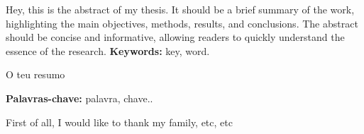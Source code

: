 


Hey, this is the abstract of my thesis. It should be a brief summary of the work, highlighting the main objectives, methods, results, and conclusions. The abstract should be concise and informative, allowing readers to quickly understand the essence of the research.
\textbf{Keywords:} key, word.


O teu resumo

\textbf{Palavras-chave:} palavra, chave..



First of all, I would like to thank my family, etc, etc